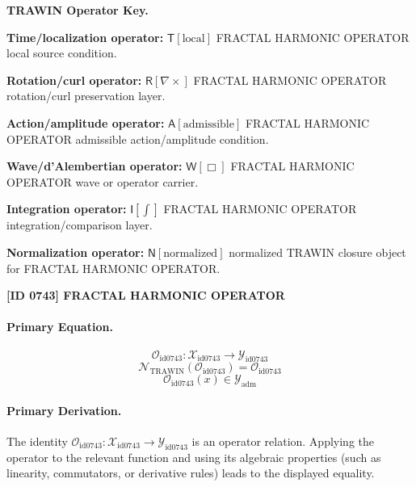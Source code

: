 \par\vspace{0.45\baselineskip}
\noindent\begin{minipage}[t]{\linewidth}
\begingroup
\small
\raggedright
\textbf{TRAWIN Operator Key.}\par
\noindent\textbf{Time/localization operator:} $\mathsf{T}\!\left[\mathrm{local}\right]$ FRACTAL HARMONIC OPERATOR local source condition.\par
\noindent\textbf{Rotation/curl operator:} $\mathsf{R}\!\left[\nabla\times\right]$ FRACTAL HARMONIC OPERATOR rotation/curl preservation layer.\par
\noindent\textbf{Action/amplitude operator:} $\mathsf{A}\!\left[\mathrm{admissible}\right]$ FRACTAL HARMONIC OPERATOR admissible action/amplitude condition.\par
\noindent\textbf{Wave/d'Alembertian operator:} $\mathsf{W}\!\left[\Box\right]$ FRACTAL HARMONIC OPERATOR wave or operator carrier.\par
\noindent\textbf{Integration operator:} $\mathsf{I}\!\left[\int\right]$ FRACTAL HARMONIC OPERATOR integration/comparison layer.\par
\noindent\textbf{Normalization operator:} $\mathsf{N}\!\left[\mathrm{normalized}\right]$ normalized TRAWIN closure object for FRACTAL HARMONIC OPERATOR.\par
\endgroup
\end{minipage}

\clearpage
\noindent\textbf{[ID 0743] FRACTAL HARMONIC OPERATOR}\par
\vspace{0.35em}
\paragraph{Primary Equation.}
\[
\mathcal{O}_{\mathrm{id0743}}:\mathcal{X}_{\mathrm{id0743}}\longrightarrow\mathcal{Y}_{\mathrm{id0743}}
\]
\[
\mathcal{N}_{\mathrm{TRAWIN}}(\mathcal{O}_{\mathrm{id0743}})=\mathcal{O}_{\mathrm{id0743}}
\]
\[
\mathcal{O}_{\mathrm{id0743}}(x)\in\mathcal{Y}_{\mathrm{adm}}
\]

\paragraph{Primary Derivation.}
The identity \( \mathcal{O}_{\mathrm{id0743}}:\mathcal{X}_{\mathrm{id0743}}\longrightarrow\mathcal{Y}_{\mathrm{id0743}} \) is an operator relation. Applying the operator to the relevant function and using its algebraic properties (such as linearity, commutators, or derivative rules) leads to the displayed equality.
